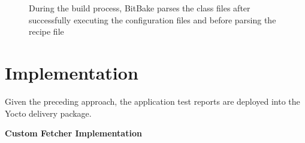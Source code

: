 \vspace{0.5cm}
\begin{figure}[H]
\caption[Class Inheritance]{During the build process, BitBake parses the class files after successfully executing the configuration files and before parsing the recipe file~\parencite{Reference1}}\label{fig:Class Inheritance}
\end{figure}
\vspace{0.5cm}


\section{Implementation} \label{section:actualimplementation}


Given the preceding approach, the application test reports are deployed into the Yocto delivery package. 













\vspace{0.5cm}
\noindent \textbf{Custom Fetcher Implementation}
\vspace{0.5cm}

